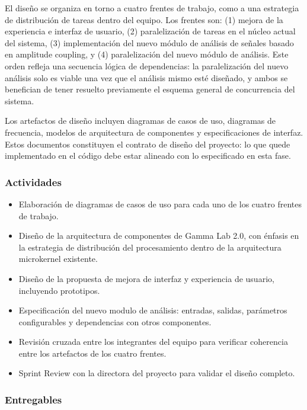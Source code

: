 \documentclass[12pt,letterpaper]{article}
\begin{document}
El diseño se organiza en torno a cuatro frentes de trabajo, como a una estrategia de distribución de tareas dentro del equipo. Los frentes son: (1) mejora de la experiencia e interfaz de usuario, (2) paralelización de tareas en el núcleo actual del sistema, (3) implementación del nuevo módulo de análisis de señales basado en amplitude coupling, y (4) paralelización del nuevo módulo de análisis. Este orden refleja una secuencia lógica de dependencias: la paralelización del nuevo análisis solo es viable una vez que el análisis mismo esté diseñado, y ambos se benefician de tener resuelto previamente el esquema general de concurrencia del sistema.

Los artefactos de diseño incluyen diagramas de casos de uso, diagramas de frecuencia, modelos de arquitectura de componentes y especificaciones de interfaz. Estos documentos constituyen el contrato de diseño del proyecto: lo que quede implementado en el código debe estar alineado con lo especificado en esta fase. 


\subsubsection{Actividades}

\begin{itemize}
  \item Elaboración de diagramas de casos de uso para cada uno de los cuatro frentes de trabajo.
  \item Diseño de la arquitectura de componentes de Gamma Lab 2.0, con énfasis en la estrategia de distribución del procesamiento dentro de la arquitectura microkernel existente.
  \item Diseño de la propuesta de mejora de interfaz y experiencia de usuario, incluyendo prototipos.
  \item Especificación del nuevo modulo de análisis: entradas, salidas, parámetros configurables y dependencias con otros componentes.
  \item Revisión cruzada entre los integrantes del equipo para verificar coherencia entre los artefactos de los cuatro frentes.
  \item Sprint Review con la directora del proyecto para validar el diseño completo.
\end{itemize}

\subsubsection{Entregables}
\end{document}
